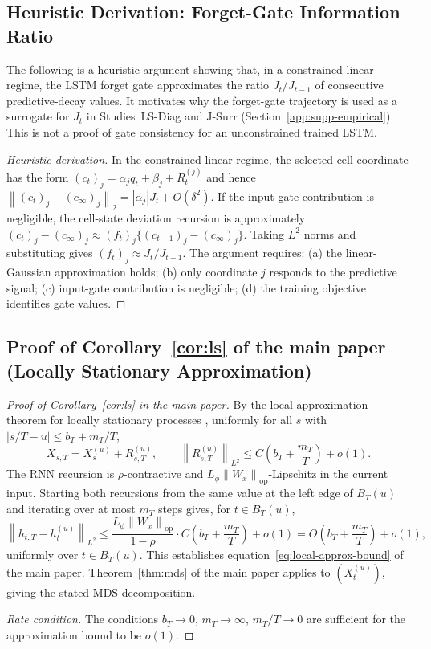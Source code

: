 \documentclass[bj,authoryear]{imsart}
\theoremstyle{plain}
\theoremstyle{definition}
\newcommand{\norm}[1]{\left\lVert #1 \right\rVert}
\begin{document}
\subsection{Heuristic Derivation: Forget-Gate Information Ratio}
\label{app:proof-forget-heuristic}

\noindent The following is a heuristic argument showing that, in a constrained
linear regime, the LSTM forget gate approximates the ratio $J_t/J_{t-1}$ of
consecutive predictive-decay values.  It motivates why the forget-gate
trajectory is used as a surrogate for $J_t$ in Studies~LS-Diag and J-Surr
(Section~\ref{app:supp-empirical}).
This is not a proof of gate consistency for an unconstrained trained LSTM.

\begin{proof}[Heuristic derivation]
  In the constrained linear regime, the selected cell coordinate has the form
  $(c_t)_j = \alpha_j q_t + \beta_j + R_t^{(j)}$ and hence
  $\norm{(c_t)_j - (c_\infty)_j}_2 = |\alpha_j|J_t + O(\delta^2)$.
  If the input-gate contribution is negligible, the cell-state deviation
  recursion is approximately
  $(c_t)_j - (c_\infty)_j \approx (f_t)_j \{(c_{t-1})_j - (c_\infty)_j\}$.
  Taking $L^2$ norms and substituting gives $(f_t)_j \approx J_t / J_{t-1}$.
  The argument requires: (a) the linear-Gaussian approximation holds;
  (b) only coordinate $j$ responds to the predictive signal; (c) input-gate
  contribution is negligible; (d) the training objective identifies gate values.
\end{proof}

\subsection{Proof of Corollary~\ref{cor:ls} of the main paper (Locally Stationary Approximation)}
\label{app:proof-corls}

\begin{proof}[Proof of Corollary~\ref{cor:ls} in the main paper]
  By the local approximation theorem for locally stationary processes
  \citep{dahlhaus1997fitting}, uniformly for all $s$ with $|s/T - u| \leq b_T + m_T/T$,
  \[
    X_{s,T} = X_s^{(u)} + R_{s,T}^{(u)},
    \qquad
    \norm{R_{s,T}^{(u)}}_{L^2} \leq C\!\left(b_T + \frac{m_T}{T}\right) + o(1).
  \]
  The RNN recursion is $\rho$-contractive and $L_\phi\norm{W_x}_{\mathrm{op}}$-Lipschitz
  in the current input.  Starting both recursions from the same value at the left
  edge of $B_T(u)$ and iterating over at most $m_T$ steps gives, for $t \in B_T(u)$,
  \[
    \norm{h_{t,T} - h_t^{(u)}}_{L^2}
    \leq \frac{L_\phi\norm{W_x}_{\mathrm{op}}}{1-\rho}
         \cdot C\!\left(b_T + \frac{m_T}{T}\right) + o(1)
    = O\!\left(b_T + \frac{m_T}{T}\right) + o(1),
  \]
  uniformly over $t \in B_T(u)$.  This establishes equation~\eqref{eq:local-approx-bound} of the main paper.
  Theorem~\ref{thm:mds} of the main paper applies to $(X_t^{(u)})$, giving the
  stated MDS decomposition.

  \textit{Rate condition.}
  The conditions $b_T\to 0$, $m_T\to\infty$, $m_T/T\to 0$ are sufficient
  for the approximation bound to be $o(1)$.
\end{proof}
\end{document}
